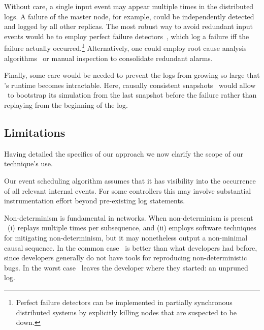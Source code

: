 Without care, a single input event may appear multiple times in the
distributed logs. A failure of the master node, for example, could be independently
detected and logged by all other replicas. The most robust way to
avoid redundant input events would be to employ perfect failure
detectors~\cite{chandra1996unreliable}, which log a failure iff
the failure actually occurred.\footnote{Perfect failure detectors can be
implemented in partially synchronous distributed systems by explicitly killing
nodes that are suspected to be down.} %
Alternatively, one
could employ root cause analysis
algorithms~\cite{yemini1996} or manual inspection to consolidate redundant
alarms.

Finally, some care would be needed to prevent the logs from growing so large that
\simulator's runtime becomes intractable. Here, causally consistent
snapshots~\cite{Chandy:1985:DSD:214451.214456} would allow \projectname~to
bootstrap its simulation from the last snapshot before the failure rather than
replaying from the beginning of the log.

\subsection{Limitations}
\label{subsec:non_goals}

Having detailed the specifics of our approach we now
clarify the scope of our technique's use.

 Our event scheduling algorithm assumes that
it has visibility into the occurrence of all relevant internal events. For
some controllers this may involve substantial instrumentation effort beyond
pre-existing log statements.

 Non-determinism
is fundamental in networks. When non-determinism is present
\projectname~(i) replays multiple times per subsequence, and (ii) employs
software techniques for mitigating non-determinism, but it may nonetheless
output a non-minimal causal sequence. In the common case \projectname~is
better than what developers had before, since developers generally
do not have tools for reproducing non-deterministic bugs.
In the worst case \projectname~leaves the
developer where they started: an unpruned log.

